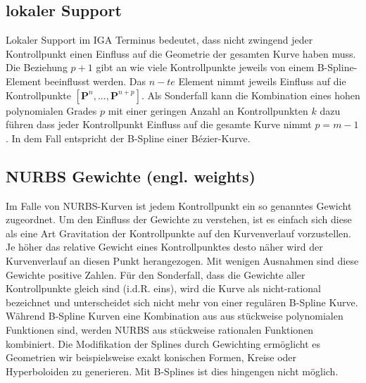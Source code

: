 \documentclass[german,a4paper,12pt,oneside]{scrbook}
\theoremstyle{definition}
\theoremstyle{definition}
\theoremstyle{definition}
\theoremstyle{definition}
\theoremstyle{definition}
\theoremstyle{definition}
\begin{document}
\subsection{lokaler Support}
Lokaler Support im IGA Terminus bedeutet, dass nicht zwingend jeder Kontrollpunkt einen Einfluss auf die Geometrie der gesamten Kurve haben muss. Die Beziehung $p+1$ gibt an wie viele Kontrollpunkte jeweils von einem B-Spline-Element beeinflusst werden. Das $n-te$ Element nimmt jeweils Einfluss auf die Kontrollpunkte $[\bm{P}^{n},...,\bm{P}^{n+p}]$. Als Sonderfall kann die Kombination eines hohen polynomialen Grades $p$ mit einer geringen Anzahl an Kontrollpunkten $k$ dazu führen dass jeder Kontrollpunkt Einfluss auf die gesamte Kurve nimmt $p = m-1$. In dem Fall entspricht der B-Spline einer Bézier-Kurve.


\subsection{NURBS Gewichte (engl. weights)}
Im Falle von NURBS-Kurven ist jedem Kontrollpunkt ein so genanntes Gewicht zugeordnet. Um den Einfluss der Gewichte zu verstehen, ist es einfach sich diese als eine Art Gravitation der Kontrollpunkte auf den Kurvenverlauf vorzustellen. Je höher das relative Gewicht eines Kontrollpunktes desto näher wird der Kurvenverlauf an diesen Punkt herangezogen. Mit wenigen Ausnahmen sind diese Gewichte positive Zahlen. Für den Sonderfall, dass die Gewichte aller Kontrollpunkte gleich sind (i.d.R. eins), wird die Kurve als nicht-rational bezeichnet und unterscheidet sich nicht mehr von einer regulären B-Spline Kurve.  Während B-Spline Kurven eine Kombination aus aus stückweise polynomialen Funktionen sind, werden NURBS aus stückweise rationalen Funktionen kombiniert. Die Modifikation der Splines durch Gewichting ermöglicht es Geometrien wir beispielsweise exakt konischen Formen, Kreise oder Hyperboloiden zu generieren. Mit B-Splines ist dies hingengen nicht möglich. 
\end{document}
